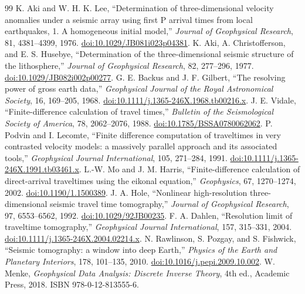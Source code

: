 \documentclass[11pt]{article}
\begin{document}
\begin{thebibliography}{99}
 K. Aki and W. H. K. Lee, ``Determination of three-dimensional velocity anomalies under a seismic array using first P arrival times from local earthquakes, 1. A homogeneous initial model,'' \emph{Journal of Geophysical Research}, 81, 4381--4399, 1976. \href{https://doi.org/10.1029/JB081i023p04381}{doi:10.1029/JB081i023p04381}.
 K. Aki, A. Christofferson, and E. S. Husebye, ``Determination of the three-dimensional seismic structure of the lithosphere,'' \emph{Journal of Geophysical Research}, 82, 277--296, 1977. \href{https://doi.org/10.1029/JB082i002p00277}{doi:10.1029/JB082i002p00277}.
 G. E. Backus and J. F. Gilbert, ``The resolving power of gross earth data,'' \emph{Geophysical Journal of the Royal Astronomical Society}, 16, 169--205, 1968. \href{https://doi.org/10.1111/j.1365-246X.1968.tb00216.x}{doi:10.1111/j.1365-246X.1968.tb00216.x}.
 J. E. Vidale, ``Finite-difference calculation of travel times,'' \emph{Bulletin of the Seismological Society of America}, 78, 2062--2076, 1988. \href{https://doi.org/10.1785/BSSA0780062062}{doi:10.1785/BSSA0780062062}.
 P. Podvin and I. Lecomte, ``Finite difference computation of traveltimes in very contrasted velocity models: a massively parallel approach and its associated tools,'' \emph{Geophysical Journal International}, 105, 271--284, 1991. \href{https://doi.org/10.1111/j.1365-246X.1991.tb03461.x}{doi:10.1111/j.1365-246X.1991.tb03461.x}.
 L.-W. Mo and J. M. Harris, ``Finite-difference calculation of direct-arrival traveltimes using the eikonal equation,'' \emph{Geophysics}, 67, 1270--1274, 2002. \href{https://doi.org/10.1190/1.1500389}{doi:10.1190/1.1500389}.
 J. A. Hole, ``Nonlinear high-resolution three-dimensional seismic travel time tomography,'' \emph{Journal of Geophysical Research}, 97, 6553--6562, 1992. \href{https://doi.org/10.1029/92JB00235}{doi:10.1029/92JB00235}.
 F. A. Dahlen, ``Resolution limit of traveltime tomography,'' \emph{Geophysical Journal International}, 157, 315--331, 2004. \href{https://doi.org/10.1111/j.1365-246X.2004.02214.x}{doi:10.1111/j.1365-246X.2004.02214.x}.
 N. Rawlinson, S. Pozgay, and S. Fishwick, ``Seismic tomography: a window into deep Earth,'' \emph{Physics of the Earth and Planetary Interiors}, 178, 101--135, 2010. \href{https://doi.org/10.1016/j.pepi.2009.10.002}{doi:10.1016/j.pepi.2009.10.002}.
 W. Menke, \emph{Geophysical Data Analysis: Discrete Inverse Theory}, 4th ed., Academic Press, 2018. ISBN 978-0-12-813555-6.

\end{thebibliography}
\end{document}
